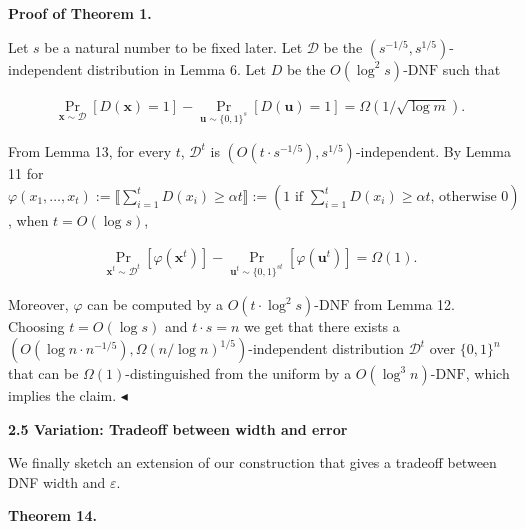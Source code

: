 \par\medskip\noindent\textbf{Proof of Theorem 1.}\par




Let $s$ be a natural number to be fixed later. Let $\mathcal{D}$ be the $(s^{-1/5},s^{1/5})$-independent distribution in Lemma 6. Let $D$ be the $O(\log^{2}s)$-$\mathrm{DNF}$ such that\par


\[\begin{gathered}
\Pr_{\bm{x}\sim\mathcal{D}}[D(\bm{x})=1]-\Pr_{\bm{u}\sim\{0,1\}^{s}}[D(\bm{u})=1]=\Omega(1/\sqrt{\log m}).
\end{gathered}\]


From Lemma 13, for every $t$, $\mathcal{D}^{t}$ is $(O(t\cdot s^{-1/5}),s^{1/5})$-independent. By Lemma 11 for $\varphi(x_{1},\dots,x_{t}):=\llbracket\sum_{i=1}^{t}D(x_{i})\geq\alpha t\rrbracket:=(1\text{ if }\sum_{i=1}^{t}D(x_{i})\geq\alpha t\text{, otherwise }0)$, when $t=O(\log s)$,\par


\[\begin{gathered}
\Pr_{\bm{x}^{t}\sim\mathcal{D}^{t}}\left[\varphi(\bm{x}^{t})\right]-\Pr_{\bm{u}^{t}\sim\{0,1\}^{st}}\left[\varphi(\bm{u}^{t})\right]=\Omega(1).
\end{gathered}\]


Moreover, $\varphi$ can be computed by a $O(t\cdot\log^{2}s)$-$\mathrm{DNF}$ from Lemma 12.
Choosing $t=O(\log s)$ and $t\cdot s=n$ we get that there exists a $(O(\log n\cdot n^{-1/5}),\Omega(n/\log n)^{1/5})$-independent distribution $\mathcal{D}^{t}$ over $\{0,1\}^{n}$ that can be $\Omega(1)$-distinguished from the uniform by a $O(\log^{3}n)$-$\mathrm{DNF}$, which implies the claim.
$\blacktriangleleft$\par






\par\medskip\noindent\textbf{
2.5 Variation: Tradeoff between width and error}\par




We finally sketch an extension of our construction that gives a tradeoff between DNF width and $\varepsilon$.\par





\par\medskip\noindent\textbf{
\textbf{Theorem 14}\textbf{.}
}\par



